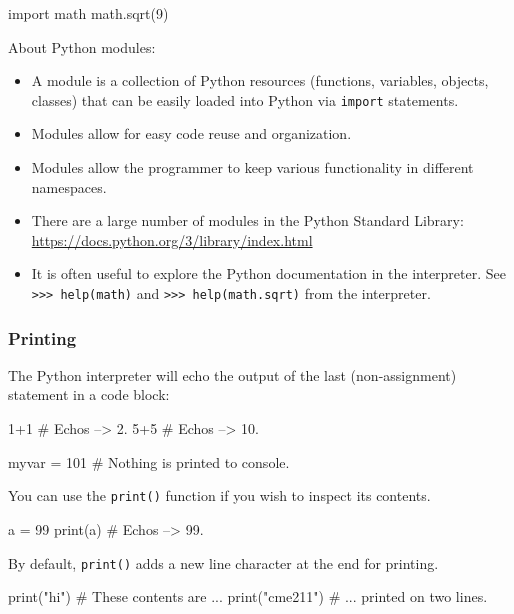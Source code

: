 \documentclass[12pt,letterpaper,twoside]{article}
\begin{document}
\begin{python}
import math
math.sqrt(9)
\end{python}

About Python modules:

\begin{itemize}
\item
  A module is a collection of Python resources (functions, variables,
  objects, classes) that can be easily loaded into Python via
  \texttt{import} statements.
\item
  Modules allow for easy code reuse and organization.
\item
  Modules allow the programmer to keep various functionality in
  different namespaces.
\item
  There are a large number of modules in the Python Standard Library:
  \url{https://docs.python.org/3/library/index.html}
\item
  It is often useful to explore the Python documentation in the
  interpreter. See \newline
  \texttt{>>> help(math)} and
  \texttt{>>> help(math.sqrt)}
  from the interpreter.
\end{itemize}

\subsubsection{Printing}

The Python interpreter 
will echo the output of the last (non-assignment)
statement in a code block:

\begin{python}
1+1  # Echos --> 2.
5+5  # Echos --> 10.
\end{python}

\begin{python}
myvar = 101  # Nothing is printed to console.
\end{python}

You can use the \texttt{print()} function if you wish to inspect its contents.
\begin{python}
a = 99
print(a)    # Echos --> 99.
\end{python}

By default, \texttt{print()} adds a new line character at the end for
printing.

\begin{python}
print("hi")           # These contents are ...
print("cme211")       # ... printed on two lines.
\end{python}
\end{document}
